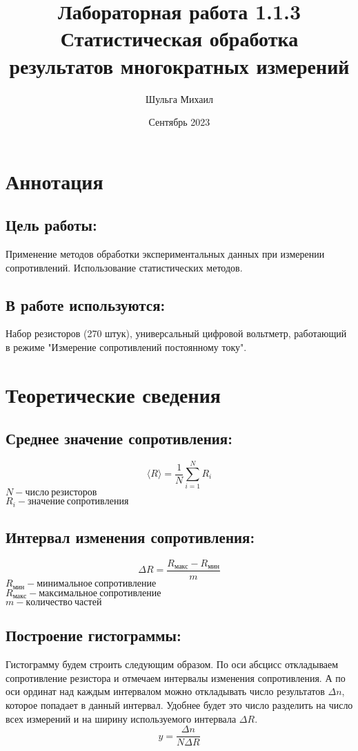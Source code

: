 \documentclass[a4paper, 12pt]{article}
\title{Лабораторная работа 1.1.3 Статистическая обработка результатов многократных измерений}
\author{Шульга Михаил}
\date{Сентябрь 2023}
\begin{document}
\maketitle

\section{Аннотация}

\subsection*{Цель работы:}
Применение методов обработки экспериментальных данных при измерении сопротивлений. Использование статистических методов. 

\subsection*{В работе используются:}
Набор резисторов (270 штук), универсальный цифровой вольтметр, работающий в режиме "Измерение сопротивлений постоянному току".

\section{Теоретические сведения}

    \subsection*{Среднее значение сопротивления:}
    $$\langle R\rangle = \frac{1}{N} \sum_{i = 1}^{N} R_i$$
    $N - число\: резисторов$\\
    $R_i - значение\:сопротивления$

    \subsection*{Интервал изменения сопротивления:}
    $$ \Delta R = \frac{R_{макс}-R_{мин}}{m}$$
    $R_{мин} - минимальное\: сопротивление$\\
    $R_{макс} - максимальное\: сопротивление$\\
    $m - количество\: частей$

    \subsection*{Построение гистограммы:}
    Гистограмму будем строить следующим образом. По оси абсцисс откладываем сопротивление резистора и отмечаем интервалы изменения сопротивления. А по оси ординат над каждым интервалом можно откладывать число результатов $\Delta n$, которое попадает в данный интервал. Удобнее будет это число разделить на число всех измерений и на ширину используемого интервала $\Delta R$.
    $$y = \frac{\Delta n}{N\Delta R}$$
\end{document}
